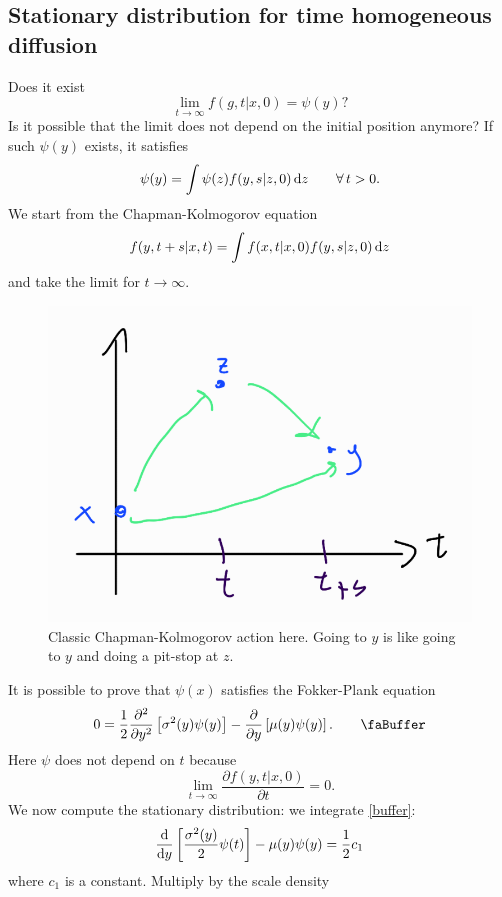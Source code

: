 \documentclass[12pt]{report}
\begin{document}
\subsection{Stationary distribution for time homogeneous diffusion}
Does it exist
\begin{equation*}
	\lim_{t\to\infty}f(g,t|x,0)=\psi(y)?
\end{equation*}
Is it possible that the limit does not depend on the initial position anymore? If such $\psi(y)$ exists, it satisfies
\begin{equation*}
	\psi(y)=\int\psi(z)f(y,s|z,0)\mathop{}\!\mathrm{d} z\qquad\forall\, t>0.
\end{equation*}
We start from the Chapman-Kolmogorov equation
\begin{equation*}
	f(y,t+s|x,t)=\int f(x,t|x,0)f(y,s|z,0)\mathop{}\!\mathrm{d} z
\end{equation*}
and take the limit for $t\to\infty$.
\begin{figure}[H]
	\centering
	\includegraphics[width=0.5\linewidth]{img/screenshot058}
	\caption{Classic Chapman-Kolmogorov action here. Going to $y$ is like going to $y$ and doing a pit-stop at $z$.}
	\label{fig:screenshot058}
\end{figure}
It is possible to prove that $\psi(x)$ satisfies the Fokker-Plank equation 
\begin{equation*}
	0=\unmezz\frac{\partial^{2}}{\partial y^{2}}\left[\sigma^{2}(y)\psi(y)\right]-\frac{\partial}{\partial y}\left[\mu(y)\psi(y)\right].\tag*{\faBuffer}\label{buffer}
\end{equation*}
Here $\psi$ does not depend on $t$ because
\begin{equation*}
	\lim_{t\to\infty}\frac{\partial f(y,t|x,0)}{\partial t}=0.
\end{equation*}
We now compute the stationary distribution: we integrate \ref{buffer}:
\begin{equation*}
	\frac{\mathop{}\!\mathrm{d}}{\mathop{}\!\mathrm{d} y}\left[\frac{\sigma^{2}(y)}{2}\psi(t)\right]-\mu(y)\psi(y)=\frac{1}{2} c_{1}
\end{equation*}
where $c_{1}$ is a constant. Multiply by the scale density
\end{document}
